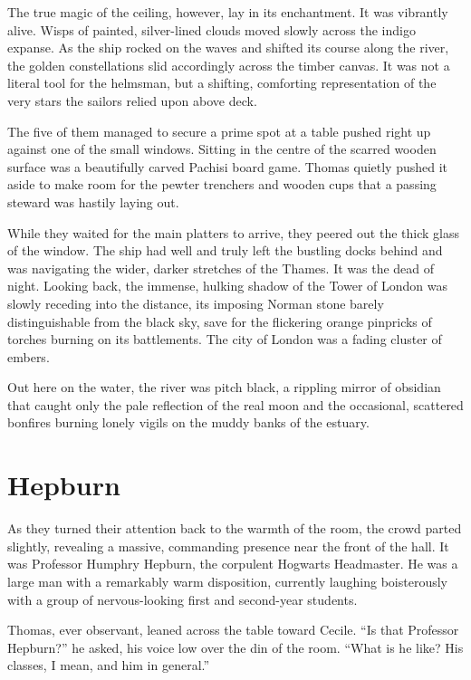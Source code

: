 The true magic of the ceiling, however, lay in its enchantment. It was vibrantly alive. Wisps of painted, silver-lined clouds moved slowly across the indigo expanse. As the ship rocked on the waves and shifted its course along the river, the golden constellations slid accordingly across the timber canvas. It was not a literal tool for the helmsman, but a shifting, comforting representation of the very stars the sailors relied upon above deck.

The five of them managed to secure a prime spot at a table pushed right up against one of the small windows. Sitting in the centre of the scarred wooden surface was a beautifully carved Pachisi board game. Thomas quietly pushed it aside to make room for the pewter trenchers and wooden cups that a passing steward was hastily laying out.

While they waited for the main platters to arrive, they peered out the thick glass of the window. The ship had well and truly left the bustling docks behind and was navigating the wider, darker stretches of the Thames. It was the dead of night. Looking back, the immense, hulking shadow of the Tower of London was slowly receding into the distance, its imposing Norman stone barely distinguishable from the black sky, save for the flickering orange pinpricks of torches burning on its battlements. The city of London was a fading cluster of embers.

Out here on the water, the river was pitch black, a rippling mirror of obsidian that caught only the pale reflection of the real moon and the occasional, scattered bonfires burning lonely vigils on the muddy banks of the estuary.

\section*{Hepburn}

As they turned their attention back to the warmth of the room, the crowd parted slightly, revealing a massive, commanding presence near the front of the hall. It was Professor Humphry Hepburn, the corpulent Hogwarts Headmaster. He was a large man with a remarkably warm disposition, currently laughing boisterously with a group of nervous-looking first and second-year students.

Thomas, ever observant, leaned across the table toward Cecile. \enquote{Is that Professor Hepburn?} he asked, his voice low over the din of the room. \enquote{What is he like? His classes, I mean, and him in general.}

